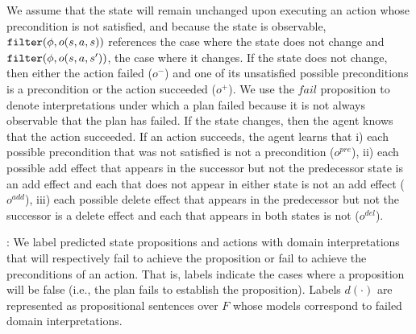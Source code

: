 \documentclass[letterpaper]{article}
\def\und#1{\noindent{\bf #1}:}
\begin{document}
\noindent We assume that the state will remain unchanged upon executing
an action whose precondition is not satisfied, and because the
state is observable, ${\tt filter}(\phi, o(s, a, s))$ references the case where
the state does not change and ${\tt filter}(\phi, o(s, a, s'))$, the case where
it changes.  If the state does not change, then either the action failed
($o^-$) and one of its unsatisfied possible preconditions is a precondition  or
the action succeeded ($o^+$).  We use the $fail$ proposition to denote
interpretations under which a plan failed because it is not always observable
that the plan has failed. If the state changes, then the agent knows that the
action succeeded. If an action  succeeds, the agent learns that i) each possible
precondition that was not satisfied is not a precondition ($o^{pre}$), ii) each possible add effect that appears in the successor but not the predecessor state is an add effect and each that does not appear in either state is not an add 
effect ($o^{add}$), iii) each possible delete effect that appears in the
predecessor but not the successor is a delete effect and each that  appears in both states is
not ($o^{del}$).



\und{Planning} We label predicted state propositions and actions with domain
interpretations that will respectively fail to achieve the proposition or fail
to achieve the preconditions of an action.  That is, labels indicate the cases
where a proposition will be false (i.e., the plan fails to establish the
proposition). Labels $d(\cdot)$ are represented as  propositional sentences over
$F$ whose models correspond to failed domain interpretations.
\end{document}

